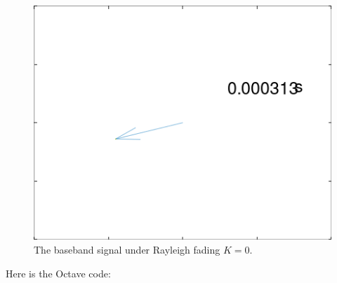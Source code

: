 \documentclass{article}
\begin{document}
\begin{figure}
  \includegraphics[width=\linewidth]{basebandgifK0.gif}
  \caption{The baseband signal under Rayleigh fading $K=0$.}
\end{figure}

Here is the Octave code:
\end{document}
